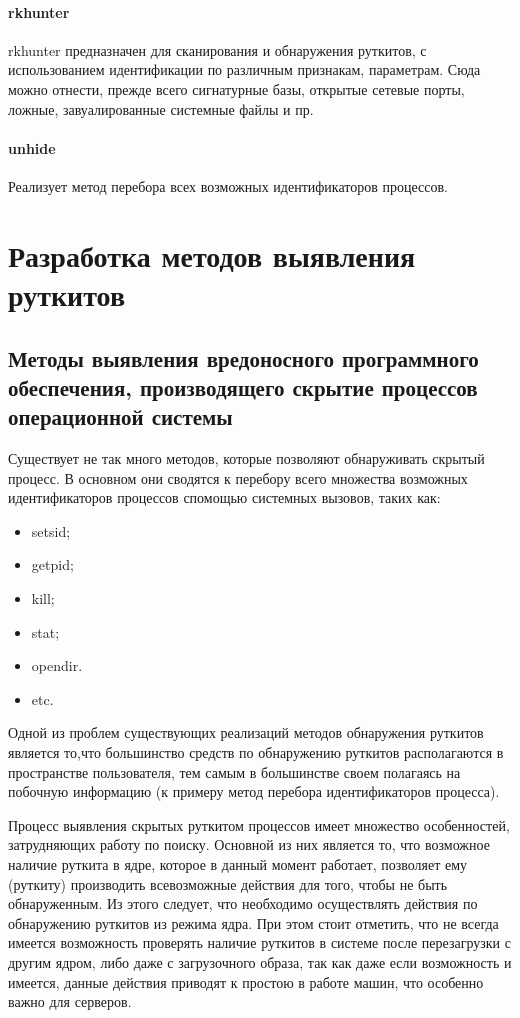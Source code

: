 \documentclass{gost7.32-2001}
\begin{document}
\paragraph{rkhunter}
rkhunter предназначен для сканирования и обнаружения руткитов, с
использованием идентификации по различным признакам, параметрам. Сюда
можно отнести, прежде всего сигнатурные базы, открытые сетевые порты,
ложные, завуалированные системные файлы и пр.
\paragraph{unhide}
Реализует метод перебора всех возможных идентификаторов процессов.

\newpage
\section{Разработка методов выявления руткитов}
\subsection{Методы выявления вредоносного программного обеспечения, производящего скрытие процессов операционной системы}

Существует не так много методов, которые позволяют обнаруживать
скрытый процесс. В основном они сводятся к перебору всего множества
возможных идентификаторов процессов спомощью системных вызовов, таких
как:
\begin{itemize}
\item
  setsid;
\item
  getpid;
\item
  kill;
\item
  stat;
\item
  opendir.
\item
  etc.
\end{itemize}

Одной из проблем существующих реализаций методов обнаружения руткитов
является то,что большинство средств по обнаружению руткитов
располагаются в пространстве пользователя, тем самым в большинстве
своем полагаясь на побочную информацию (к примеру метод перебора
идентификаторов процесса).

Процесс выявления скрытых руткитом процессов имеет множество
особенностей, затрудняющих работу по поиску. Основной из них является
то, что возможное наличие руткита в ядре, которое в данный момент
работает, позволяет ему (руткиту) производить всевозможные действия
для того, чтобы не быть обнаруженным. Из этого следует, что необходимо
осуществлять действия по обнаружению руткитов из режима ядра. При этом
стоит отметить, что не всегда имеется возможность проверять наличие
руткитов в системе после перезагрузки с другим ядром, либо даже с
загрузочного образа, так как даже если возможность и имеется, данные
действия приводят к простою в работе машин, что особенно важно для
серверов.
\end{document}
